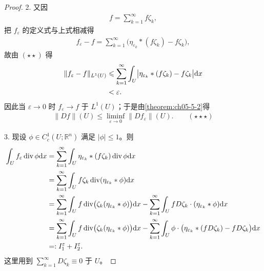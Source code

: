 \documentclass[../../main.tex]{subfiles}%
\begin{document}
\begin{proof}
2. 又因
\begin{align*}
f=\sum_{k=1}^{\infty}f\zeta_k,
\end{align*}
把 $f_\varepsilon$ 的定义式与上式相减得
\begin{align*}
f_\varepsilon-f=\sum_{k=1}^{\infty}\bigl(\eta_{\varepsilon_k}*(f\zeta_k)-f\zeta_k\bigr),
\end{align*}
故由 $(\star\star)$ 得
\begin{align*}
\lVert f_\varepsilon-f\rVert_{L^1(U)}&\leqslant\sum_{k=1}^{\infty}\int_U\bigl\lvert\eta_{\varepsilon_k}*(f\zeta_k)-f\zeta_k\bigr\rvert\mathrm{d} x\\
&<\varepsilon .
\end{align*}
因此当 $\varepsilon\to0$ 时 $f_\varepsilon\to f$ 于 $L^1(U)$；于是由\cref{theorem:ch05-5-2}得%
\begin{align*}
\lVert Df\rVert(U)\leqslant\liminf_{\varepsilon\to0}\lVert Df_\varepsilon\rVert(U).\qquad(\star\star\star)
\end{align*}

3. 现设 $\phi\in C_c^1(U;\mathbb{R}^n)$ 满足 $\lvert\phi\rvert\leqslant1$。则
\begin{align*}
\int_U f_\varepsilon\operatorname{div}\phi\mathrm{d} x&=\sum_{k=1}^{\infty}\int_U\eta_{\varepsilon_k}*(f\zeta_k)\operatorname{div}\phi\mathrm{d} x\\
&=\sum_{k=1}^{\infty}\int_U f\zeta_k\operatorname{div}(\eta_{\varepsilon_k}*\phi)\mathrm{d} x\\
&=\sum_{k=1}^{\infty}\int_U f\operatorname{div}\bigl(\zeta_k(\eta_{\varepsilon_k}*\phi)\bigr)\mathrm{d} x
-\sum_{k=1}^{\infty}\int_U fD\zeta_k\cdot(\eta_{\varepsilon_k}*\phi)\mathrm{d} x\\
&=\sum_{k=1}^{\infty}\int_U f\operatorname{div}\bigl(\zeta_k(\eta_{\varepsilon_k}*\phi)\bigr)\mathrm{d} x
-\sum_{k=1}^{\infty}\int_U\phi\cdot\bigl(\eta_{\varepsilon_k}*(fD\zeta_k)-fD\zeta_k\bigr)\mathrm{d} x\\
&=:I_1^{\varepsilon}+I_2^{\varepsilon}.
\end{align*}
这里用到 $\sum_{k=1}^{\infty}D\zeta_k\equiv0$ 于 $U$。


\end{proof}
\end{document}

